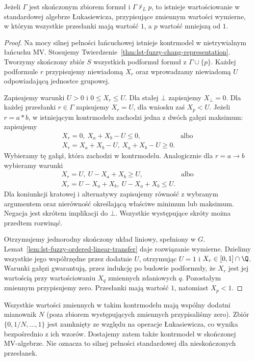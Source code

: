 \begin{twierdzenie}
\label{thm:lst-fuzzy-mv-rational-countermodel}
Jeżeli $\Gamma$ jest skończonym zbiorem formuł i
$\Gamma\nvdash_L p$, to istnieje
wartościowanie w standardowej algebrze Łukasiewicza,
przypisujące zmiennym wartości wymierne, w którym
wszystkie przesłanki mają wartość $1$, a $p$ wartość
mniejszą od $1$.
\end{twierdzenie}
\begin{proof}
Na mocy silnej pełności łańcuchowej istnieje kontrmodel
w nietrywialnym łańcuchu MV. Stosujemy
Twierdzenie~\ref{thm:lst-fuzzy-chang-representation}.
Tworzymy skończony zbiór $S$ wszystkich podformuł
formuł z $\Gamma\cup\{p\}$. Każdej podformule $r$
przypisujemy niewiadomą $X_r$ oraz wprowadzamy
niewiadomą $U$ odpowiadającą jednostce grupowej.

Zapisujemy warunki $U>0$ i $0\leq X_r\leq U$.
Dla stałej $\bot$ zapisujemy $X_\bot=0$.
Dla każdej przesłanki $r\in\Gamma$ zapisujemy
$X_r=U$, dla wniosku zaś $X_p<U$.
Jeżeli $r=a*b$, w istniejącym kontrmodelu zachodzi
jedna z dwóch gałęzi maksimum: zapisujemy
\[
\begin{array}{ll}
 X_r=0,\ X_a+X_b-U\leq0, &\text{albo}\\
 X_r=X_a+X_b-U,\ X_a+X_b-U\geq0.
\end{array}
\]
Wybieramy tę gałąź, która zachodzi w kontrmodelu.
Analogicznie dla $r=a\to b$ wybieramy warunki
\[
\begin{array}{ll}
 X_r=U,\ U-X_a+X_b\geq U, &\text{albo}\\
 X_r=U-X_a+X_b,\ U-X_a+X_b\leq U.
\end{array}
\]
Dla koniunkcji kratowej i alternatywy zapisujemy
równość z wybranym argumentem oraz nierówność
określającą właściwe minimum lub maksimum.
Negacja jest skrótem implikacji do $\bot$.
Wszystkie występujące skróty można przedtem rozwinąć.

Otrzymujemy jednorodny skończony układ liniowy,
spełniony w $G$. Lemat~\ref{lem:lst-fuzzy-ordered-linear-transfer}
daje rozwiązanie wymierne. Dzielimy wszystkie jego
współrzędne przez dodatnie $U$, otrzymując
$U=1$ i $X_r\in[0,1]\cap\Q$.
Warunki gałęzi gwarantują, przez indukcję po budowie
podformuły, że $X_r$ jest jej wartością przy
wartościowaniu $X_q$ zmiennych zdaniowych $q$.
Pozostałym zmiennym przypisujemy zero.
Przesłanki mają wartość $1$, natomiast $X_p<1$.
\end{proof}
Wszystkie wartości zmiennych w takim kontrmodelu
mają wspólny dodatni mianownik $N$ (poza zbiorem
występujących zmiennych przypisaliśmy zero).
Zbiór $\{0,1/N,\ldots,1\}$ jest zamknięty ze względu
na operacje Łukasiewicza, co wynika bezpośrednio
z ich wzorów. Dostajemy zatem także kontrmodel
w skończonej MV-algebrze. Nie oznacza to silnej
pełności standardowej dla nieskończonych przesłanek.

